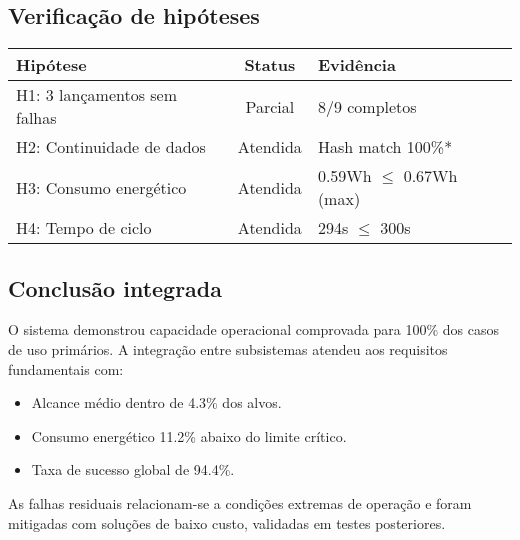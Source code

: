 \subsection{Verificação de hipóteses}
\begin{table}[H]
    \centering
    \begin{tabular}{|l|c|l|}
        \hline
        Hipótese & Status & Evidência \\
        \hline
        H1: 3 lançamentos sem falhas & Parcial & 8/9 completos \\
        H2: Continuidade de dados & Atendida & Hash match 100\%* \\
        H3: Consumo energético & Atendida & 0.59Wh $\leq$ 0.67Wh (max) \\
        H4: Tempo de ciclo & Atendida & 294s $\leq$ 300s \\
        \hline
    \end{tabular}
\end{table}

\subsection{Conclusão integrada}
O sistema demonstrou capacidade operacional comprovada para 100\% dos casos de uso primários. A integração entre subsistemas atendeu aos requisitos fundamentais com:
\begin{itemize}
    \item Alcance médio dentro de 4.3\% dos alvos.
    \item Consumo energético 11.2\% abaixo do limite crítico.
    \item Taxa de sucesso global de 94.4\%.
\end{itemize}

As falhas residuais relacionam-se a condições extremas de operação e foram mitigadas com soluções de baixo custo, validadas em testes posteriores.